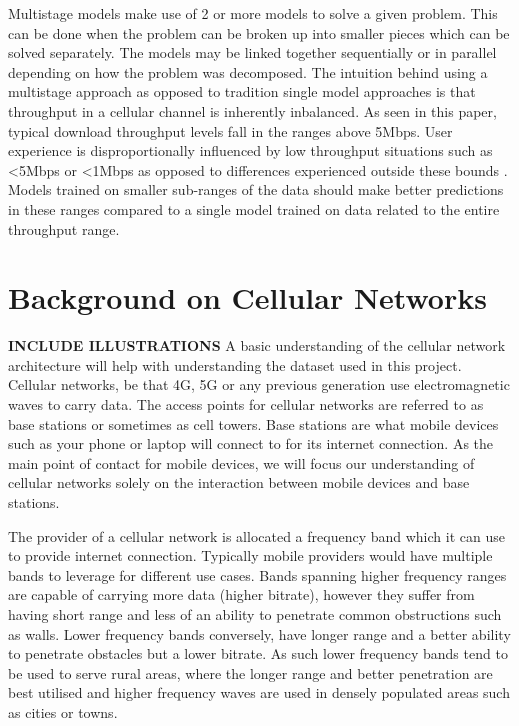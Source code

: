 Multistage models make use of 2 or more models to solve a given problem. This can be done when the problem can be broken up into smaller pieces which can be solved separately. The models may be linked together sequentially or in parallel depending on how the problem was decomposed. The intuition behind using a multistage approach as opposed to tradition single model approaches is that throughput in a cellular channel is inherently inbalanced. As seen in this paper, typical download throughput levels fall in the ranges above 5Mbps. User experience is disproportionally influenced by low throughput situations such as <5Mbps or <1Mbps as opposed to differences experienced outside these bounds \cite{PDH}. Models trained on smaller sub-ranges of the data should make better predictions in these ranges compared to a single model trained on data related to the entire throughput range.

\section{Background on Cellular Networks}
\textbf{INCLUDE ILLUSTRATIONS}
A basic understanding of the cellular network architecture will help with understanding the dataset used in this project. Cellular networks, be that 4G, 5G or any previous generation use electromagnetic waves to carry data. The access points for cellular networks are referred to as base stations or sometimes as cell towers. Base stations are what mobile devices such as your phone or laptop will connect to for its internet connection. As the main point of contact for mobile devices, we will focus our understanding of cellular networks solely on the interaction between mobile devices and base stations.

The provider of a cellular network is allocated a frequency band which it can use to provide internet connection. Typically mobile providers would have multiple bands to leverage for different use cases. Bands spanning higher frequency ranges are capable of carrying more data (higher bitrate), however they suffer from having short range and less of an ability to penetrate  common obstructions such as walls. Lower frequency bands conversely, have longer range and a better ability to penetrate obstacles but a lower bitrate. As such lower frequency bands tend to be used to serve rural areas, where the longer range and better penetration are best utilised and higher frequency waves are used in densely populated areas such as cities or towns.

